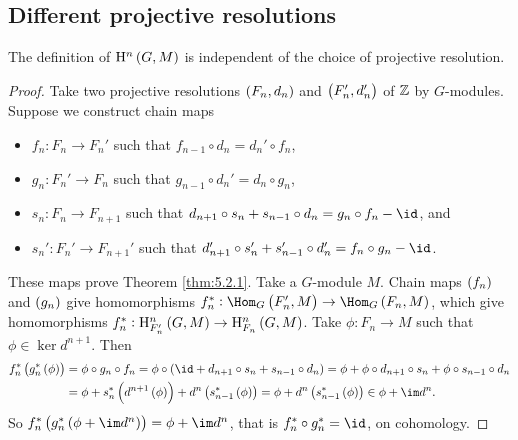 \subsection{Different projective resolutions}

\begin{theorem}
\label{thm:5.2.1}
The definition of $ \H^n\br{G, M} $ is independent of the choice of projective resolution.
\end{theorem}

\begin{proof}
Take two projective resolutions $ \br{F_n, d_n} $ and $ \br{F_n', d_n'} $ of $ \mathbb{Z} $ by $ G $-modules. Suppose we construct chain maps
\begin{itemize}
\item $ f_n : F_n \to F_n' $ such that $ f_{n - 1} \circ d_n = d_n' \circ f_n $,
\item $ g_n : F_n' \to F_n $ such that $ g_{n - 1} \circ d_n' = d_n \circ g_n $,
\item $ s_n : F_n \to F_{n + 1} $ such that $ d_{n + 1} \circ s_n + s_{n - 1} \circ d_n = g_n \circ f_n - \id $, and
\item $ s_n' : F_n' \to F_{n + 1}' $ such that $ d_{n + 1}' \circ s_n' + s_{n - 1}' \circ d_n' = f_n \circ g_n - \id $.
\end{itemize}
These maps prove Theorem \ref{thm:5.2.1}. Take a $ G $-module $ M $. Chain maps $ \br{f_n} $ and $ \br{g_n} $ give homomorphisms $ f_n^* : \Hom_G\br{F_n', M} \to \Hom_G\br{F_n, M} $, which give homomorphisms $ f_n^* : \H_{F_n'}^n\br{G, M} \to \H_{F_n}^n\br{G, M} $. Take $ \phi : F_n \to M $ such that $ \phi \in \ker d^{n + 1} $. Then
\begin{align*}
f_n^*\br{g_n^*\br{\phi}}
& = \phi \circ g_n \circ f_n
= \phi \circ \br{\id + d_{n + 1} \circ s_n + s_{n - 1} \circ d_n}
= \phi + \phi \circ d_{n + 1} \circ s_n + \phi \circ s_{n - 1} \circ d_n \\
& = \phi + s_n^*\br{d^{n + 1}\br{\phi}} + d^n\br{s_{n - 1}^*\br{\phi}}
= \phi + d^n\br{s_{n - 1}^*\br{\phi}}
\in \phi + \im d^n.
\end{align*}
So $ f_n^*\br{g_n^*\br{\phi + \im d^n}} = \phi + \im d^n $, that is $ f_n^* \circ g_n^* = \id $, on cohomology.

\pagebreak


\end{proof}
